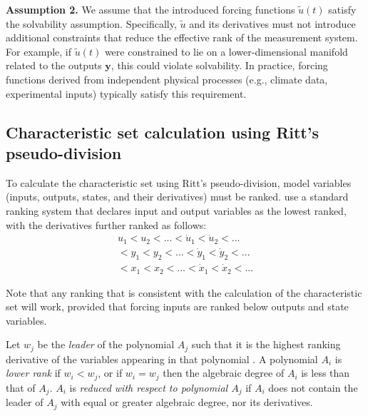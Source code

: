 \documentclass[a4paper,fleqn]{cas-dc}
\theoremstyle{definition}
\begin{document}
\noindent \textbf{Assumption 2.}
We assume that the introduced forcing functions $\tilde{u}(t)$ satisfy the solvability assumption. Specifically, $\tilde{u}$ and its derivatives must not introduce additional constraints that reduce the effective rank of the measurement system. For example, if $\tilde{u}(t)$ were constrained to lie on a lower-dimensional manifold related to the outputs $\pmb{y}$, this could violate solvability. In practice, forcing functions derived from independent physical processes (e.g., climate data, experimental inputs) typically satisfy this requirement.

\subsection{Characteristic set calculation using Ritt's pseudo-division} \label{RPDalgorithm}

\noindent To calculate the characteristic set using Ritt's pseudo-division, model variables (inputs, outputs, states, and their derivatives) must be ranked. 
\citet{bellu2007daisy} use a standard ranking system that declares input and output variables as the lowest ranked, with the derivatives further ranked as follows: 
\begin{multline} \label{ranking}
u_1 < u_2 < ... <\dot{u}_1 < \dot{u}_2 < ... \\< y_1 < y_2 < ... <\dot{y}_1 < \dot{y}_2 < ...\\< x_1 < x_2 < ...<\dot{x}_1 < \dot{x}_2 < ...
\end{multline}

Note that any ranking that is consistent with the calculation of the characteristic set will work, provided that forcing inputs are ranked below outputs and state variables. 

Let $w_j$ be the \textit{leader} of the polynomial $A_j$ such that it is the highest ranking derivative of the variables appearing in that polynomial \cite{meshkat2012alternative, bellu2007daisy}.
A polynomial $A_i$ is \textit{lower rank} if $w_i < w_j$, or if $w_i = w_j$ then the algebraic degree of $A_i$ is less than that of $A_j$. 
$A_i$ is \textit{reduced with respect to polynomial $A_j$} if $A_i$ does not contain the leader of $A_j$ with equal or greater algebraic degree, nor its derivatives.
\end{document}
